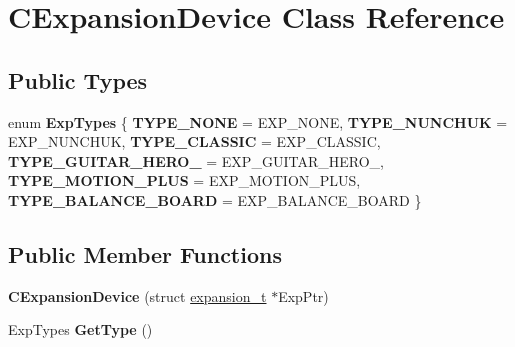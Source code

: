 \hypertarget{class_c_expansion_device}{\section{\-C\-Expansion\-Device \-Class \-Reference}
\label{class_c_expansion_device}
}
\subsection*{\-Public \-Types}
\begin{DoxyCompactItemize}
\item 
enum {\bfseries \-Exp\-Types} \{ \*
{\bfseries \-T\-Y\-P\-E\-\_\-\-N\-O\-N\-E} =  \-E\-X\-P\-\_\-\-N\-O\-N\-E, 
{\bfseries \-T\-Y\-P\-E\-\_\-\-N\-U\-N\-C\-H\-U\-K} =  \-E\-X\-P\-\_\-\-N\-U\-N\-C\-H\-U\-K, 
{\bfseries \-T\-Y\-P\-E\-\_\-\-C\-L\-A\-S\-S\-I\-C} =  \-E\-X\-P\-\_\-\-C\-L\-A\-S\-S\-I\-C, 
{\bfseries \-T\-Y\-P\-E\-\_\-\-G\-U\-I\-T\-A\-R\-\_\-\-H\-E\-R\-O\-\_} =  \-E\-X\-P\-\_\-\-G\-U\-I\-T\-A\-R\-\_\-\-H\-E\-R\-O\-\_, 
\*
{\bfseries \-T\-Y\-P\-E\-\_\-\-M\-O\-T\-I\-O\-N\-\_\-\-P\-L\-U\-S} =  \-E\-X\-P\-\_\-\-M\-O\-T\-I\-O\-N\-\_\-\-P\-L\-U\-S, 
{\bfseries \-T\-Y\-P\-E\-\_\-\-B\-A\-L\-A\-N\-C\-E\-\_\-\-B\-O\-A\-R\-D} =  \-E\-X\-P\-\_\-\-B\-A\-L\-A\-N\-C\-E\-\_\-\-B\-O\-A\-R\-D
 \}
\end{DoxyCompactItemize}
\subsection*{\-Public \-Member \-Functions}
\begin{DoxyCompactItemize}
\item 
\hypertarget{class_c_expansion_device_a68809e7c5c3736cc307e48630a7168a0}{{\bfseries \-C\-Expansion\-Device} (struct \hyperlink{structexpansion__t}{expansion\-\_\-t} $\ast$\-Exp\-Ptr)}\label{class_c_expansion_device_a68809e7c5c3736cc307e48630a7168a0}

\item 
\hypertarget{class_c_expansion_device_afe34f8c67883e2283b87332aed1b372f}{\-Exp\-Types {\bfseries \-Get\-Type} ()}\label{class_c_expansion_device_afe34f8c67883e2283b87332aed1b372f}

\end{DoxyCompactItemize}
